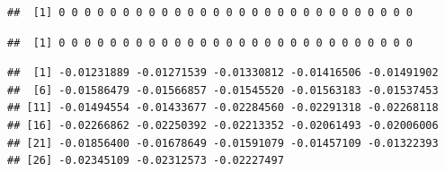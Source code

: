 \documentclass[
]{krantz}
\makeatletter
\newenvironment{Shaded}{\begin{snugshade}}{\end{snugshade}}
\newcommand{\DataTypeTok}[1]{\textcolor[rgb]{0.13,0.29,0.53}{#1}}
\newcommand{\DecValTok}[1]{\textcolor[rgb]{0.00,0.00,0.81}{#1}}
\newcommand{\FloatTok}[1]{\textcolor[rgb]{0.00,0.00,0.81}{#1}}
\newcommand{\KeywordTok}[1]{\textcolor[rgb]{0.13,0.29,0.53}{\textbf{#1}}}
\newcommand{\NormalTok}[1]{#1}
\newcommand{\OperatorTok}[1]{\textcolor[rgb]{0.81,0.36,0.00}{\textbf{#1}}}
\newcommand{\StringTok}[1]{\textcolor[rgb]{0.31,0.60,0.02}{#1}}
\newenvironment{kframe}{%
\medskip{}
\setlength{\fboxsep}{.8em}
 \def\at@end@of@kframe{}%
 \ifinner\ifhmode%
  \def\at@end@of@kframe{\end{minipage}}%
  \begin{minipage}{\columnwidth}%
 \fi\fi%
 \def\FrameCommand##1{\hskip\@totalleftmargin \hskip-\fboxsep
 \colorbox{shadecolor}{##1}\hskip-\fboxsep
     \hskip-\linewidth \hskip-\@totalleftmargin \hskip\columnwidth}%
 \MakeFramed {\advance\hsize-\width
   \@totalleftmargin\z@ \linewidth\hsize
   \@setminipage}}%
 {\par\unskip\endMakeFramed%
 \at@end@of@kframe}
\renewenvironment{Shaded}{\begin{kframe}}{\end{kframe}}
\makeatother
\begin{document}
\begin{Shaded}
\end{Shaded}

\begin{verbatim}
##  [1] 0 0 0 0 0 0 0 0 0 0 0 0 0 0 0 0 0 0 0 0 0 0 0 0 0 0 0 0
\end{verbatim}

\begin{Shaded}
\end{Shaded}

\begin{verbatim}
##  [1] 0 0 0 0 0 0 0 0 0 0 0 0 0 0 0 0 0 0 0 0 0 0 0 0 0 0 0 0
\end{verbatim}

\begin{Shaded}
\end{Shaded}

\begin{verbatim}
##  [1] -0.01231889 -0.01271539 -0.01330812 -0.01416506 -0.01491902
##  [6] -0.01586479 -0.01566857 -0.01545520 -0.01563183 -0.01537453
## [11] -0.01494554 -0.01433677 -0.02284560 -0.02291318 -0.02268118
## [16] -0.02266862 -0.02250392 -0.02213352 -0.02061493 -0.02006006
## [21] -0.01856400 -0.01678649 -0.01591079 -0.01457109 -0.01322393
## [26] -0.02345109 -0.02312573 -0.02227497
\end{verbatim}

\begin{Shaded}
\end{Shaded}
\end{document}
